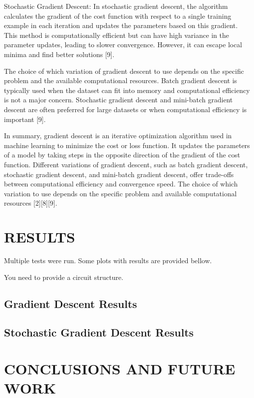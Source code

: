 \documentclass[inscr,ack,preface]{diphdthesis}
\begin{document}
    Stochastic Gradient Descent: In stochastic gradient descent, the algorithm calculates the gradient of the cost function with respect to a single training example in each iteration and updates the parameters based on this gradient. This method is computationally efficient but can have high variance in the parameter updates, leading to slower convergence. However, it can escape local minima and find better solutions [9].

The choice of which variation of gradient descent to use depends on the specific problem and the available computational resources. Batch gradient descent is typically used when the dataset can fit into memory and computational efficiency is not a major concern. Stochastic gradient descent and mini-batch gradient descent are often preferred for large datasets or when computational efficiency is important [9].

In summary, gradient descent is an iterative optimization algorithm used in machine learning to minimize the cost or loss function. It updates the parameters of a model by taking steps in the opposite direction of the gradient of the cost function. Different variations of gradient descent, such as batch gradient descent, stochastic gradient descent, and mini-batch gradient descent, offer trade-offs between computational efficiency and convergence speed. The choice of which variation to use depends on the specific problem and available computational resources [2][8][9].



\chapter{RESULTS}
Multiple tests were run. Some plots with results are provided bellow.

You need to provide a circuit structure.

\section{Gradient Descent Results}

\section{Stochastic Gradient Descent Results}


\chapter{CONCLUSIONS AND FUTURE WORK}
\end{document}
